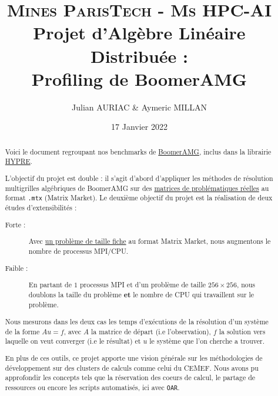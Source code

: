 \documentclass[10pt,twocolumn,letterpaper]{article}
\title{
		\usefont{OT1}{bch}{b}{n}
		\normalfont \normalsize \textsc{Mines ParisTech - Ms HPC-AI} \\ [10pt]
		\huge Projet d'Algèbre Linéaire Distribuée :\\ Profiling de BoomerAMG \\
}
\author{Julian AURIAC \& Aymeric MILLAN}
\affil{Cours de Christophe BOVET}
\date{17 Janvier 2022}
\def\code#1{\texttt{#1}}
\begin{document}
\setlength\headheight{26pt}


\maketitle

\begin{abstract}
Voici le document regroupant nos benchmarks de
\href{https://hypre.readthedocs.io/en/latest/solvers-boomeramg.html}{BoomerAMG},
inclus dans la librairie
\href{https://hypre.readthedocs.io/en/latest/index.html}{HYPRE}.

L'objectif du projet est double : il s'agit d'abord d'appliquer les méthodes de
résolution multigrilles algébriques de BoomerAMG sur des
\href{https://sparse.tamu.edu/}{matrices de problématiques réelles} au format
\code{.mtx} (Matrix Market).
Le deuxième objectif du projet est la réalisation de deux études
d'extensibilités :
\begin{description}
    \item [\textbullet\space Forte :] Avec
\href{https://sparse.tamu.edu/Janna/Emilia_923}{un problème de taille fiche}
au format Matrix Market, nous augmentons le nombre de processus MPI/CPU.
    \item [\textbullet\space Faible :] En partant de $1$ processus MPI et
d'un problème de taille $256 \times 256$, nous doublons la taille du problème
\textbf{et} le nombre de CPU qui travaillent sur le problème.
\end{description}

Nous mesurons dans les deux cas les temps d'exécutions de la résolution d'un
système de la forme $Au = f$, avec $A$ la matrice de départ (i.e l'observation),
$f$ la solution vers laquelle on veut converger (i.e le résultat) et $u$
le système que l'on cherche a trouver.

En plus de ces outils, ce projet apporte une vision générale sur les
méthodologies de développement sur des clusters de calculs comme celui du CEMEF. 
Nous avons pu approfondir les concepts tels que la réservation des coeurs de
calcul, le partage de ressources ou encore les scripts automatisés,
ici avec \code{OAR}.
\end{abstract}
\end{document}
